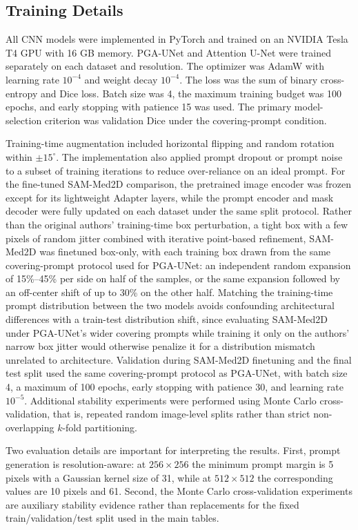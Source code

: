 \documentclass{ieeeaccess}
\begin{document}
\subsection{Training Details}
All CNN models were implemented in PyTorch and trained on an NVIDIA Tesla T4 GPU with 16 GB memory. PGA-UNet and Attention U-Net were trained separately on each dataset and resolution. The optimizer was AdamW with learning rate $10^{-4}$ and weight decay $10^{-4}$. The loss was the sum of binary cross-entropy and Dice loss. Batch size was 4, the maximum training budget was 100 epochs, and early stopping with patience 15 was used. The primary model-selection criterion was validation Dice under the covering-prompt condition.

Training-time augmentation included horizontal flipping and random rotation within $\pm15^\circ$. The implementation also applied prompt dropout or prompt noise to a subset of training iterations to reduce over-reliance on an ideal prompt. For the fine-tuned SAM-Med2D comparison, the pretrained image encoder was frozen except for its lightweight Adapter layers, while the prompt encoder and mask decoder were fully updated on each dataset under the same split protocol. Rather than the original authors' training-time box perturbation, a tight box with a few pixels of random jitter combined with iterative point-based refinement, SAM-Med2D was finetuned box-only, with each training box drawn from the same covering-prompt protocol used for PGA-UNet: an independent random expansion of 15\%--45\% per side on half of the samples, or the same expansion followed by an off-center shift of up to 30\% on the other half. Matching the training-time prompt distribution between the two models avoids confounding architectural differences with a train-test distribution shift, since evaluating SAM-Med2D under PGA-UNet's wider covering prompts while training it only on the authors' narrow box jitter would otherwise penalize it for a distribution mismatch unrelated to architecture. Validation during SAM-Med2D finetuning and the final test split used the same covering-prompt protocol as PGA-UNet, with batch size 4, a maximum of 100 epochs, early stopping with patience 30, and learning rate $10^{-5}$. Additional stability experiments were performed using Monte Carlo cross-validation, that is, repeated random image-level splits rather than strict non-overlapping $k$-fold partitioning.

Two evaluation details are important for interpreting the results. First, prompt generation is resolution-aware: at $256\times256$ the minimum prompt margin is 5 pixels with a Gaussian kernel size of 31, while at $512\times512$ the corresponding values are 10 pixels and 61. Second, the Monte Carlo cross-validation experiments are auxiliary stability evidence rather than replacements for the fixed train/validation/test split used in the main tables.
\end{document}
